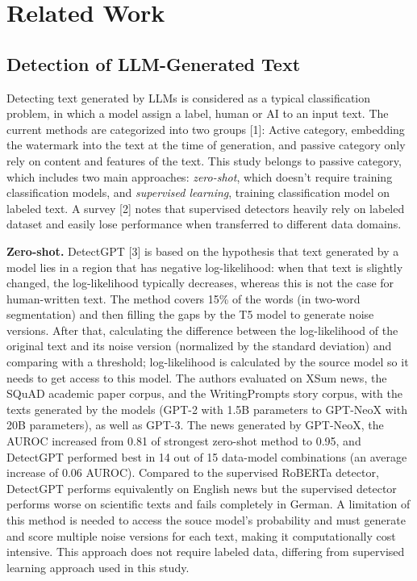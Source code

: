 \documentclass[conference,a4paper]{IEEEtran}
\begin{document}
\section{Related Work}
\label{sec:related}

\subsection{Detection of LLM-Generated Text}
Detecting text generated by LLMs is considered as a typical classification problem, in which a model assign a label, human or AI to an input text. The current methods are categorized into two groups [1]: Active category, embedding the watermark into the text at the time of generation, and passive category only rely on content and features of the text. This study belongs to passive category, which includes two main approaches: \emph{zero-shot}, which doesn't require training classification models, and \emph{supervised learning}, training classification model on labeled text. A survey [2] notes that supervised detectors heavily rely on labeled dataset and easily lose performance when transferred to different data domains.  


\textbf{Zero-shot.} DetectGPT [3] is based on the hypothesis that text generated by a model lies in a region that has negative log-likelihood: when that text is slightly changed, the log-likelihood typically decreases, whereas this is not the case for human-written text. The method covers 15\% of the words (in two-word segmentation) and then filling the gaps by the T5 model to generate noise versions. After that, calculating the difference between the log-likelihood of the original text and its noise version (normalized by the standard deviation) and comparing with a threshold; log-likelihood is calculated by the source model so it needs to get access to this model. The authors evaluated on XSum news, the SQuAD academic paper corpus, and the WritingPrompts story corpus, with the texts generated by the models (GPT-2 with 1.5B parameters to GPT-NeoX with 20B parameters), as well as GPT-3. The news generated by GPT-NeoX, the AUROC increased from 0.81 of strongest zero-shot method to 0.95, and DetectGPT performed best in 14 out of 15 data-model combinations (an average increase of 0.06 AUROC). Compared to the supervised RoBERTa detector, DetectGPT performs equivalently on English news but the supervised detector performs worse on scientific texts and fails completely in German. A limitation of this method is needed to access the souce model's probability and must generate and score multiple noise versions for each text, making it computationally cost intensive. This approach does not require labeled data, differing from supervised learning approach used in this study. 
\end{document}
